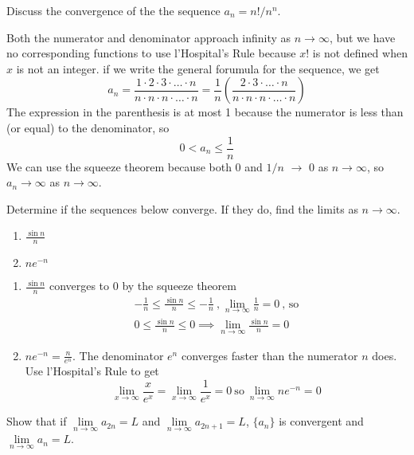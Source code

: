   \begin{example}
    Discuss the convergence of the the sequence $a_n=n!/n^n$.
  \end{example}
  \begin{solution}
    Both the numerator and denominator approach infinity as $n\to\infty$, but we have no corresponding functions to use l'Hospital's Rule because $x!$ is not defined when $x$ is not an integer. if we write the general forumula for the sequence, we get
    $$a_n = \frac{1\cdot2\cdot3\cdot\ldots\cdot n}{n\cdot n\cdot n\cdot\ldots\cdot n} = \frac{1}{n}\left(\frac{2\cdot3\cdot\ldots\cdot n}{n\cdot n\cdot n\cdot\ldots\cdot n}\right)$$
    The expression in the parenthesis is at most 1 because the numerator is less than (or equal) to the denominator, so
    $$0<a_n \leq \frac{1}{n}$$
    We can use the squeeze theorem because both 0 and $1/n$ $\to$ 0 as $n\to\infty$, so $a_n \to \infty$ as $n\to\infty$.
  \end{solution}
  \begin{example}
    Determine if the sequences below converge. If they do, find the limits as $n\to\infty$.
    \begin{enumerate}
      \item $\frac{\sin n}{n}$
      \item $ne^{-n}$
    \end{enumerate}
  \end{example}
  \begin{solution}
    \begin{enumerate}
      \item $\frac{\sin n}{n}$ converges to 0 by the squeeze theorem
            \begin{gather*}
               -\frac{1}{n}\leq\frac{\sin n}{n}\leq-\frac{1}{n}\ \text{,}\ \lim_{n\to\infty}\frac{1}{n}=0\ \text{, so} \\
               0 \leq\frac{\sin n}{n}\leq 0 \implies \lim_{n\to\infty}\frac{\sin n}{n}=0
            \end{gather*}
      \item $ne^{-n} = \frac{n}{e^n}$. The denominator $e^n$ converges faster than the numerator $n$ does. Use l'Hospital's Rule to get $$\lim_{x\to\infty}\frac{x}{e^x} = \lim_{x\to\infty}\frac{1}{e^x} = 0\ \text{so}\ \lim_{n\to\infty}ne^{-n} = 0$$
    \end{enumerate}
  \end{solution}
  \begin{example}
    Show that if $\lim\limits_{n \to \infty}a_{2n} = L$ and $\lim\limits_{n \to \infty}a_{2n+1} = L$, $\{a_n\}$ is convergent and $\lim\limits_{n \to \infty}a_n = L$.
  \end{example}
